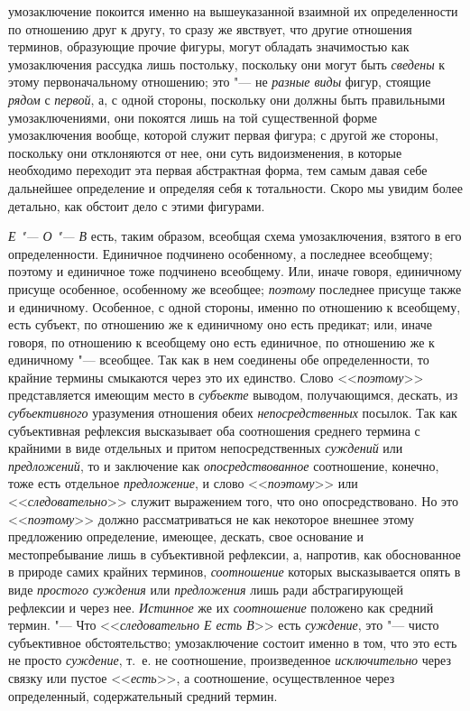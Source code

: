 {{умозаключение покоится именно на вышеуказанной взаимной их определенности
по отношению друг к другу, то сразу же явствует, что другие отношения
терминов, образующие прочие фигуры, могут обладать значимостью как
умозаключения рассудка лишь постольку, поскольку они могут быть
{\em сведены} к этому
первоначальному отношению; это "--- не
{\em разные виды} фигур,
стоящие {\em рядом} с
{\em первой}, а, с одной
стороны, поскольку они должны быть правильными умозаключениями, они
покоятся лишь на той существенной форме умозаключения вообще, которой
служит первая фигура; с другой же стороны, поскольку они отклоняются от
нее, они суть видоизменения, в которые необходимо переходит эта первая
абстрактная форма, тем самым давая себе дальнейшее определение и определяя
себя к тотальности. Скоро мы увидим более детально, как обстоит дело с
этими фигурами.

{\em Е "--- О "--- В} есть, таким образом, всеобщая схема
умозаключения, взятого в его определенности. Единичное подчинено
особенному, а последнее всеобщему; поэтому и единичное тоже подчинено
всеобщему. Или, иначе говоря, единичному присуще особенное, особенному же
всеобщее; {\em поэтому}
последнее присуще также и единичному. Особенное, с одной
стороны, именно по отношению к всеобщему, есть субъект, по отношению же к
единичному оно есть предикат; или, иначе говоря, по отношению к всеобщему
оно есть единичное, по отношению же к единичному "--- всеобщее.
Так как в нем соединены обе определенности, то крайние термины смыкаются
через это их единство. Слово
<<{\em поэтому}>>
представляется имеющим место в
{\em субъекте} выводом,
получающимся, дескать, из
{\em субъективного}
уразумения отношения обеих
{\em непосредственных}
посылок. Так как субъективная рефлексия высказывает оба
соотношения среднего термина с крайними в виде отдельных и притом
непосредственных {\em суждений}
или {\em предложений},
то и заключение как
{\em опосредствованное}
соотношение, конечно, тоже есть отдельное
{\em предложение}, и
слово <<{\em поэтому}>> или
<<{\em следовательно}>>
служит выражением того, что оно опосредствовано. Но это
<<{\em поэтому}>> должно
рассматриваться не как некоторое внешнее этому предложению определение,
имеющее, дескать, свое основание и местопребывание лишь в субъективной
рефлексии, а, напротив, как обоснованное в природе самих крайних терминов,
{\em соотношение} которых
высказывается опять в виде {\em простого
суждения} или
{\em предложения} лишь
ради абстрагирующей рефлексии и через нее.
{\em Истинное} же их
{\em соотношение}
положено как средний термин. "--- Что
<<{\em следовательно Е есть В}>>
есть {\em суждение},
это "--- чисто субъективное обстоятельство;
умозаключение состоит именно в том, что это есть не просто
{\em суждение}, т.~е. не
соотношение, произведенное
{\em исключительно} через
связку или пустое <<{\em есть}>>,
а соотношение, осуществленное через определенный,
содержательный средний термин.

}}

